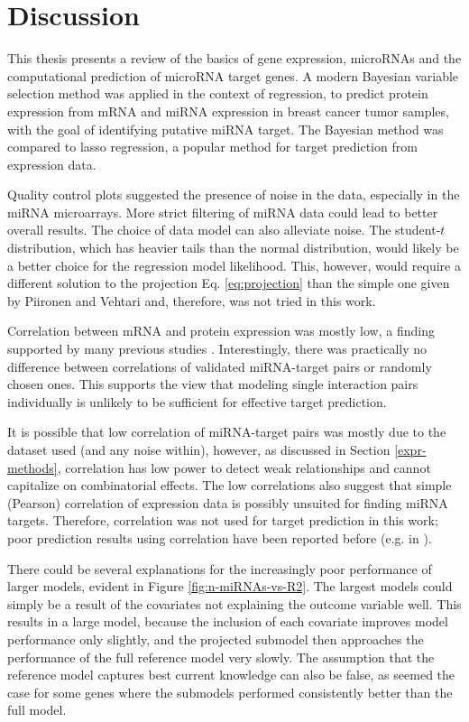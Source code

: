 
\section{Discussion}

This thesis presents a review of the basics of gene expression, microRNAs and
the computational prediction of microRNA target genes. A modern Bayesian
variable selection method was applied in the context of regression, to predict
protein expression from mRNA and miRNA expression in breast cancer tumor
samples, with the goal of identifying putative miRNA target. The Bayesian
method was compared to lasso regression, a popular method for target
prediction from expression data.

Quality control plots suggested the presence of noise in the data, especially
in the miRNA microarrays. More strict filtering of miRNA data could lead to
better overall results. The choice of data model can also alleviate noise. The
student-$t$ distribution, which has heavier tails than the normal
distribution, would likely be a better choice for the regression model
likelihood. This, however, would require a different solution to the
projection Eq. \eqref{eq:projection} than the simple one given by Piironen
and Vehtari \citep{Piironen2015} and, therefore, was not tried in this work.

Correlation between mRNA and protein expression was mostly low, a finding
supported by many previous studies \citep{Payne2015}. Interestingly, there was
practically no difference between correlations of validated miRNA-target pairs
or randomly chosen ones. This supports the view that modeling single
interaction pairs individually is unlikely to be sufficient for effective target
prediction.

It is possible that low correlation of miRNA-target pairs was mostly due to the
dataset used (and any noise within), however, as discussed in Section \ref{expr-methods},
correlation has low power to detect weak relationships and
cannot capitalize on combinatorial effects. The low correlations also suggest
that simple (Pearson) correlation of expression data is possibly unsuited for
finding miRNA targets.  Therefore, correlation was not used for target
prediction in this work; poor prediction results using correlation have been
reported before (e.g. in
\citep{Muniategui2012}).

There could be several explanations for the increasingly poor performance of
larger models, evident in Figure \ref{fig:n-miRNAs-vs-R2}. The largest models
could simply be a result of the covariates not explaining the outcome variable
well. This results in a large model, because the inclusion of each covariate
improves model performance only slightly, and the projected submodel then
approaches the performance of the full reference model very slowly. The
assumption that the reference model captures best current knowledge can also be
false, as seemed the case for some genes where the submodels performed 
consistently better than the full model.

